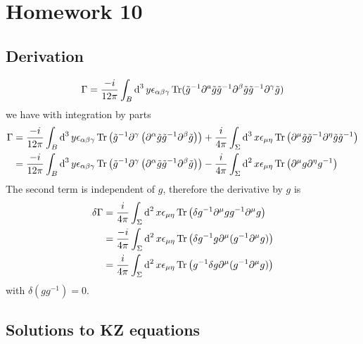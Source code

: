 \newpage
\section{Homework 10}
\subsection{Derivation}
\[
 \Gamma = \frac{-i}{12 \pi} \int_B \operatorname{d}^3 y \epsilon_{\alpha\beta\gamma} \operatorname{Tr}( \tilde{g}^{-1} \partial^a \tilde{g} \tilde{g}^{-1} \partial^{\beta} \tilde{g} \tilde{g}^{-1} \partial^\gamma \tilde{g})
\]
we have with integration by parts
\begin{equation}
	\begin{split}
	\Gamma & = \frac{-i}{12 \pi} \int_B \operatorname{d}^3 y \epsilon_{\alpha\beta\gamma} \operatorname{Tr}\left( \tilde{g}^{-1} \partial^\gamma \left( \partial^\alpha \tilde{g} \tilde{g}^{-1} \partial^\beta \tilde{g}\right) \right) + \frac{i}{4\pi} \int_\Sigma \operatorname{d}^3 x \epsilon_{\mu \eta} \operatorname{Tr} \left( \partial^{\mu} \tilde{g} \tilde{g}^{-1} \partial^{\eta} \tilde{g} \tilde{g}^{-1} \right)\\
	& =  \frac{-i}{12 \pi} \int_B \operatorname{d}^3 y \epsilon_{\alpha\beta\gamma} \operatorname{Tr}\left( \tilde{g}^{-1} \partial^\gamma \left( \partial^\alpha \tilde{g} \tilde{g}^{-1} \partial^\beta \tilde{g}\right) \right) - \frac{i}{4 \pi} \int_{\Sigma} \operatorname{d}^2 x \epsilon_{\mu\eta} \operatorname{Tr}\left( \partial^{\mu} g \partial^{\eta} g^{-1}\right)
	\end{split}
\end{equation}
The second term is independent of $g$, therefore the derivative by $g$ is
\begin{equation}
	\begin{split}
	\delta \Gamma & = \frac{i}{4\pi} \int_{\Sigma}\operatorname{d}^2 x \epsilon_{\mu\eta} \operatorname{Tr} \left(\delta g^{-1} \partial^{\mu} g g^{-1} \partial^{\mu} g \right)\\
	& = \frac{-i}{4\pi} \int_{\Sigma} \operatorname{d}^2 x \epsilon_{\mu\eta} \operatorname{Tr} \left( \delta g^{-1} g \partial^{\mu} (g^{-1} \partial^{\mu} g) \right)\\
	& = \frac{i}{4\pi} \int_{\Sigma} \operatorname{d}^2 x \epsilon_{\mu\eta} \operatorname{Tr} \left(  g^{-1} \delta g \partial^{\mu} (g^{-1} \partial^{\mu} g) \right)
	\end{split}
\end{equation}
with $\delta(g g^{-1})=0$.
\subsection{Solutions to KZ equations}
